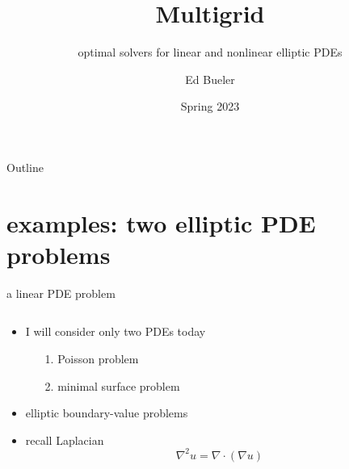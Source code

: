 \documentclass[10pt,
               svgnames,
               hyperref={colorlinks,citecolor=DeepPink4,linkcolor=FireBrick,urlcolor=Maroon},
               usepdftitle=false]{beamer}
\title{Multigrid}
\subtitle{optimal solvers for linear and nonlinear elliptic PDEs}
\author{Ed Bueler}
\institute[]{UAF Math 692 Scalable Seminar}
\date{Spring 2023}
\newcommand{\grad}{\nabla}
\newcommand{\Div}{\nabla \cdot}
\begin{document}
\beamertemplatenavigationsymbolsempty

\begin{frame}
  \maketitle
\end{frame}

\begin{frame}{Outline}
  \tableofcontents[hideallsubsections]
\end{frame}


\section{examples: two elliptic PDE problems}

\begin{frame}{a linear PDE problem}

\begin{columns}
\begin{column}{0.6\textwidth}
\begin{itemize}
\item I will consider only two PDEs today
    \begin{itemize}
    \item[1.] Poisson problem
    \item[2.] minimal surface problem
    \end{itemize}
\item elliptic boundary-value problems
\item recall Laplacian
    $$\grad^2 u =\Div(\grad u)$$


\end{itemize}
\end{column}
\end{columns}
\end{frame}
\end{document}
